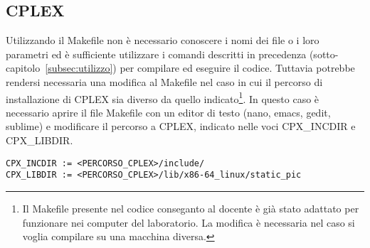 \subsection{CPLEX}\label{subsec:cplex}
Utilizzando il Makefile non è necessario conoscere i nomi dei file o i loro parametri ed è sufficiente
utilizzare i comandi descritti in precedenza (sotto-capitolo~\ref{subsec:utilizzo}) per compilare
ed eseguire il codice.
Tuttavia potrebbe rendersi necessaria una modifica al Makefile nel caso in cui il percorso di installazione
di CPLEX sia diverso da quello indicato\footnote{Il Makefile presente nel codice conseganto al docente è già stato adattato per funzionare nei computer
del laboratorio. La modifica è necessaria nel caso si voglia compilare su una macchina diversa.}.
In questo caso è necessario aprire il file \textsf{Makefile} con un editor di testo (nano, emacs, gedit, sublime)
e modificare il percorso a CPLEX, indicato nelle voci \textsf{CPX\_INCDIR} e \textsf{CPX\_LIBDIR}.
\label{lst:modifica-makefile}
\begin{lstlisting}[style=BashStyle]
CPX_INCDIR := <PERCORSO_CPLEX>/include/
CPX_LIBDIR := <PERCORSO_CPLEX>/lib/x86-64_linux/static_pic
\end{lstlisting}
